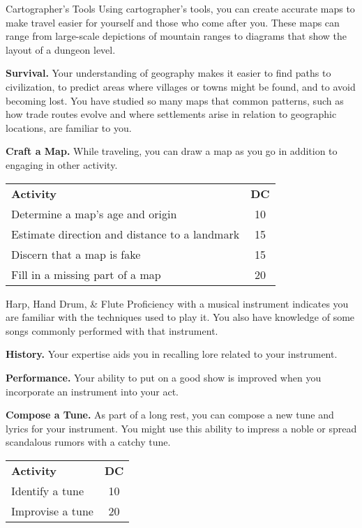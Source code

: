 \begin{Card}[card 2 of 2]{Cartographer's Tools}
Using cartographer's tools, you can create accurate maps to make travel
easier for yourself and those who come after you. These maps can range
from large-scale depictions of mountain ranges to diagrams that show the
layout of a dungeon level.


\textbf{Survival.} Your understanding of geography makes it easier to
find paths to civilization, to predict areas where villages or towns
might be found, and to avoid becoming lost. You have studied so many
maps that common patterns, such as how trade routes evolve and where
settlements arise in relation to geographic locations, are familiar to
you.

\textbf{Craft a Map.} While traveling, you can draw a map as you go in
addition to engaging in other activity.

\begin{tabular}{lc}
\textbf{Activity} & \textbf{DC} \\
Determine a map's age and origin & 10 \\
Estimate direction and distance to a landmark & 15 \\
Discern that a map is fake & 15 \\
Fill in a missing part of a map & 20
\end{tabular}
\end{Card}

\begin{Card}{Harp, Hand Drum, \& Flute}
Proficiency with a musical instrument indicates you are familiar with
the techniques used to play it. You also have knowledge of some songs
commonly performed with that instrument.

\textbf{History.} Your expertise aids you in recalling lore related to
your instrument.

\textbf{Performance.} Your ability to put on a good show is improved
when you incorporate an instrument into your act.

\textbf{Compose a Tune.} As part of a long rest, you can compose a new
tune and lyrics for your instrument. You might use this ability to
impress a noble or spread scandalous rumors with a catchy tune.

\begin{tabular}{lc}
\textbf{Activity} & \textbf{DC} \\
Identify a tune & 10 \\
Improvise a tune & 20
\end{tabular}

\end{Card}



